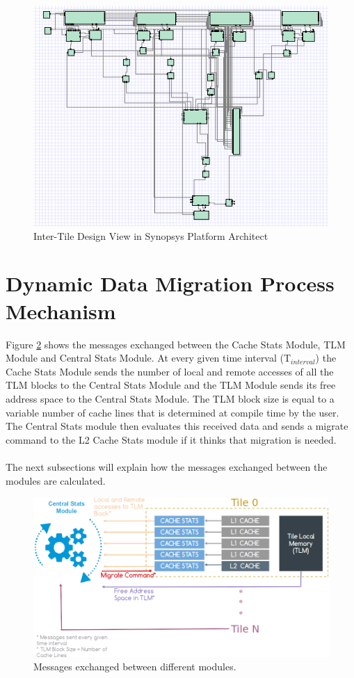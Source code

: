 \documentclass{listhesis}
\begin{document}
\begin{figure}
  \includegraphics[width=\linewidth]{processorsynopsys.png}
  \centering
  \caption{Inter-Tile Design View in Synopsys Platform Architect}
  \label{fig:processorsynopsys}
\end{figure}
\section{Dynamic Data Migration Process Mechanism}
Figure \ref{fig:approachOfSolution} shows the messages exchanged between the Cache Stats Module, TLM Module and Central Stats Module. At every given time interval (T$_{interval}$) the Cache Stats Module sends the number of local and remote accesses of all the TLM blocks to the Central Stats Module and the TLM Module sends its free address space to the Central Stats Module. The TLM block size is equal to a variable number of cache lines that is determined at compile time by the user. The Central Stats module then evaluates this received data and sends a migrate command to the L2 Cache Stats module if it thinks that migration is needed. \\
\\
The next subsections will explain how the messages exchanged between the modules are calculated. 
\begin{figure}
  \includegraphics[width=\linewidth]{approachOfSolution1.png}
  \centering
  \caption{Messages exchanged between different modules.}
  \label{fig:approachOfSolution}
\end{figure}
\end{document}
